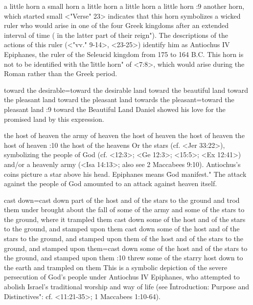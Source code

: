     {a little horn} %
    {a small horn} %
    {a little horn} %
    {a little horn} %
    {a little horn} %
:9 {another horn, which started small} <"Verse" 23> indicates that 
this horn symbolizes a wicked ruler who would arise in one of the 
four Greek kingdoms after an extended interval of time ( \"in the latter part of their reign"). The
descriptions of the actions of this ruler (<"vv." 9-14>, <23-25>) identify 
him as Antiochus IV Epiphanes, the ruler of the Seleucid kingdom from 175 to 164 B.C. This horn is
not to be identified with the \"little horn" of <7:8>, which would arise during the Roman rather than
the Greek period.

    {toward the desirable}={toward the desirable land} %
    {toward the beautiful land} %
    {toward the pleasant land} %
    {toward the pleasant land} %
    {towards the pleasant}={toward the pleasant land} %
:9 {toward the Beautiful Land} Daniel showed his love for the promised land by this
expression.

    {the host of heaven} %
    {the army of heaven} %
    {the host of heaven} %
    {the host of heaven} %
    {the host of heaven} %
:10 {the host of the heavens} Or the stars (cf. <Jer 33:22>), symbolizing the people of
God (cf. <12:3>; <Ge 12:3>; <15:5>; <Ex 12:41>) and/or a  
heavenly army (<Isa 14:13>; also see 2 Maccabees 9:10). Antiochus's coins picture a star above his head. Epiphanes 
means \"God manifest." The attack against the people of God amounted to an attack against heaven itself.

    {cast down}={cast down part of the host and of the stars to the ground and trod them under} %
    {brought about the fall of some of the army and some of the stars to the ground, where it trampled them} %
    {cast down some of the host and of the stars to the ground, and stamped upon them} %
    {cast down some of the host and of the stars to the ground, and stamped upon them} %
    {of the host and of the stars to the ground, and stamped upon them}={cast down some of the host and of the stars to the ground, and stamped upon them} %
:10 {threw some of the starry host down to the earth and trampled on them}
This is a  symbolic depiction of the severe persecution of God's people under 
Antiochus IV Epiphanes, who attempted to abolish Israel's traditional worship and way of life (see
 \"Introduction: Purpose and Distinctives": cf. <11:21-35>; 1 Maccabees 1:10-64). 



